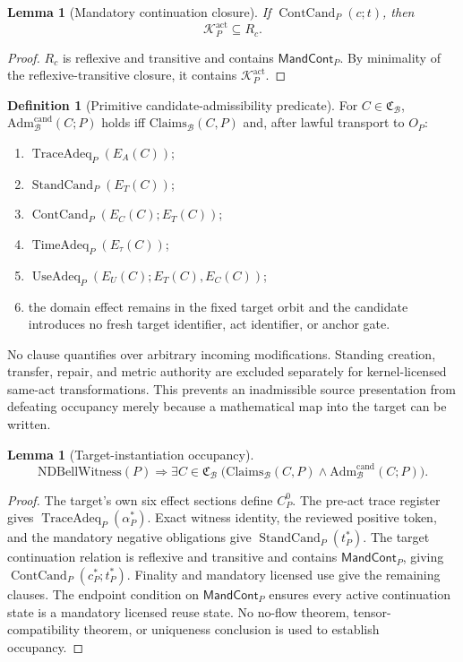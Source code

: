 \documentclass[11pt]{article}
\newtheorem{lemma}[theorem]{Lemma}
\theoremstyle{definition}
\newtheorem{definition}[theorem]{Definition}
\newcommand{\Bell}{\mathcal{B}}
\newcommand{\NDBell}{\mathrm{NDBellWitness}}
\newcommand{\BellConstr}{\mathfrak{C}_{\Bell}}
\newcommand{\AdmBell}{\mathrm{Adm}^{\mathrm{cand}}_{\Bell}}
\newcommand{\ClaimsBell}{\mathrm{Claims}_{\Bell}}
\newcommand{\Active}{\mathrm{act}}
\newcommand{\MandCont}{\mathsf{MandCont}}
\begin{document}
\begin{lemma}[Mandatory continuation closure]\label{lem:universalactivecontinuation}
If $\operatorname{ContCand}_P(c;t)$, then
\[
\mathcal K_P^{\Active}\subseteq R_c.
\]
\end{lemma}
\begin{proof}
$R_c$ is reflexive and transitive and contains $\MandCont_P$. By minimality of the reflexive-transitive closure, it contains $\mathcal K_P^{\Active}$.
\end{proof}

\begin{definition}[Primitive candidate-admissibility predicate]\label{def:admissibleconstruction}
For $C\in\BellConstr$, $\AdmBell(C;P)$ holds iff $\ClaimsBell(C,P)$ and, after lawful transport to $O_P$:
\begin{enumerate}[label=(B\arabic*),leftmargin=3em]
\item $\operatorname{TraceAdeq}_P(E_A(C))$;
\item $\operatorname{StandCand}_P(E_T(C))$;
\item $\operatorname{ContCand}_P(E_C(C);E_T(C))$;
\item $\operatorname{TimeAdeq}_P(E_{\tau}(C))$;
\item $\operatorname{UseAdeq}_P(E_U(C);E_T(C),E_C(C))$;
\item the domain effect remains in the fixed target orbit and the candidate introduces no fresh target identifier, act identifier, or anchor gate.
\end{enumerate}
No clause quantifies over arbitrary incoming modifications. Standing creation, transfer, repair, and metric authority are excluded separately for kernel-licensed same-act transformations. This prevents an inadmissible source presentation from defeating occupancy merely because a mathematical map into the target can be written.
\end{definition}

\begin{lemma}[Target-instantiation occupancy]\label{lem:targetoccupancy}
\[
\NDBell(P)\Longrightarrow
\exists C\in\BellConstr\;
\bigl(\ClaimsBell(C,P)\wedge\AdmBell(C;P)\bigr).
\]
\end{lemma}
\begin{proof}
The target's own six effect sections define $C_P^0$. The pre-act trace register gives $\operatorname{TraceAdeq}_P(\alpha_P^*)$. Exact witness identity, the reviewed positive token, and the mandatory negative obligations give $\operatorname{StandCand}_P(t_P^*)$. The target continuation relation is reflexive and transitive and contains $\MandCont_P$, giving $\operatorname{ContCand}_P(c_P^*;t_P^*)$. Finality and mandatory licensed use give the remaining clauses. The endpoint condition on $\MandCont_P$ ensures every active continuation state is a mandatory licensed reuse state. No no-flow theorem, tensor-compatibility theorem, or uniqueness conclusion is used to establish occupancy.
\end{proof}
\end{document}

